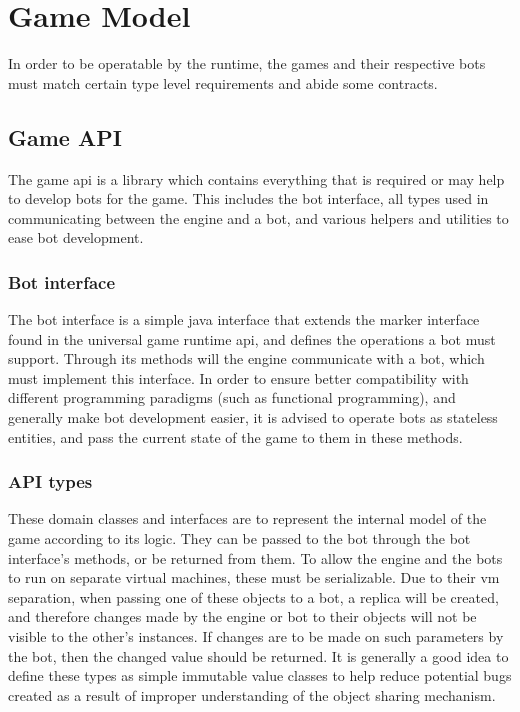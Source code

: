 
%

\chapter{Game Model}\label{sect:GameModel}

In order to be operatable by the runtime, the games and their respective bots must match certain type level requirements and abide some contracts.

	\section{Game API}
	
	The game api is a library which contains everything that is required or may help to develop bots for the game. This includes the bot interface, all types used in communicating between the engine and a bot, and various helpers and utilities to ease bot development.

		\subsection*{Bot interface}
		
		The bot interface is a simple java interface that extends the  marker interface found in the universal game runtime api, and defines the operations a bot must support. Through its methods will the engine communicate with a bot, which must implement this interface. In order to ensure better compatibility with different programming paradigms (such as functional programming), and generally make bot development easier, it is advised to operate bots as stateless entities, and pass the current state of the game to them in these methods. 
		
		\subsection*{API types}

		These domain classes and interfaces are to represent the internal model of the game according to its logic. They can be passed to the bot through the bot interface's methods, or be returned from them. To allow the engine and the bots to run on separate virtual machines, these must be serializable. Due to their vm separation, when passing one of these objects to a bot, a replica will be created, and therefore changes made by the engine or bot to their objects will not be visible to the other's instances. If changes are to be made on such parameters by the bot, then the changed value should be returned. It is generally a good idea to define these types as simple immutable value classes to help reduce potential bugs created as a result of improper understanding of the object sharing mechanism.
		
